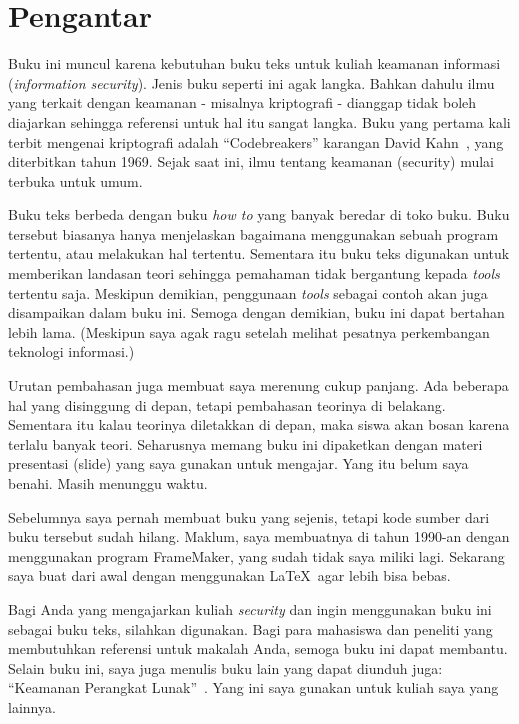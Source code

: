 \chapter{Pengantar}

Buku ini muncul karena kebutuhan buku teks untuk kuliah
keamanan informasi ({\em information security}).
Jenis buku seperti ini agak langka.
Bahkan dahulu ilmu yang terkait dengan keamanan - misalnya kriptografi -
dianggap tidak boleh diajarkan sehingga referensi untuk hal itu
sangat langka.
Buku yang pertama kali terbit mengenai kriptografi adalah
``Codebreakers'' karangan David Kahn~\cite{davidkahn},
yang diterbitkan tahun 1969.
Sejak saat ini, ilmu tentang keamanan (security) mulai terbuka untuk umum.

Buku teks berbeda dengan buku {\em how to} yang banyak beredar
di toko buku. Buku tersebut biasanya hanya menjelaskan bagaimana
menggunakan sebuah program tertentu, atau melakukan hal tertentu.
Sementara itu buku teks digunakan untuk memberikan landasan teori
sehingga pemahaman tidak bergantung kepada {\em tools} tertentu saja.
Meskipun demikian, penggunaan {\em tools} sebagai contoh akan
juga disampaikan dalam buku ini.
Semoga dengan demikian, buku ini dapat bertahan lebih lama.
(Meskipun saya agak ragu setelah melihat pesatnya perkembangan
teknologi informasi.)

Urutan pembahasan juga membuat saya merenung cukup panjang.
Ada beberapa hal yang disinggung di depan, tetapi pembahasan teorinya
di belakang. Sementara itu kalau teorinya diletakkan di depan,
maka siswa akan bosan karena terlalu banyak teori.
Seharusnya memang buku ini dipaketkan dengan materi presentasi
(slide) yang saya gunakan untuk mengajar. 
Yang itu belum saya benahi. Masih menunggu waktu.

Sebelumnya saya pernah membuat buku yang sejenis, tetapi kode sumber
dari buku tersebut sudah hilang.
Maklum, saya membuatnya di tahun 1990-an dengan menggunakan program
FrameMaker, yang sudah tidak saya miliki lagi.
Sekarang saya buat dari awal dengan menggunakan \LaTeX \ agar
lebih bisa bebas.

Bagi Anda yang mengajarkan kuliah {\em security} dan ingin menggunakan
buku ini sebagai buku teks, silahkan digunakan.
Bagi para mahasiswa dan peneliti yang membutuhkan referensi untuk
makalah Anda, semoga buku ini dapat membantu.
Selain buku ini, saya juga menulis buku lain yang dapat diunduh juga:
``Keamanan Perangkat Lunak''~\cite{BRsecuresoftware}.
Yang ini saya gunakan untuk kuliah saya yang lainnya.

